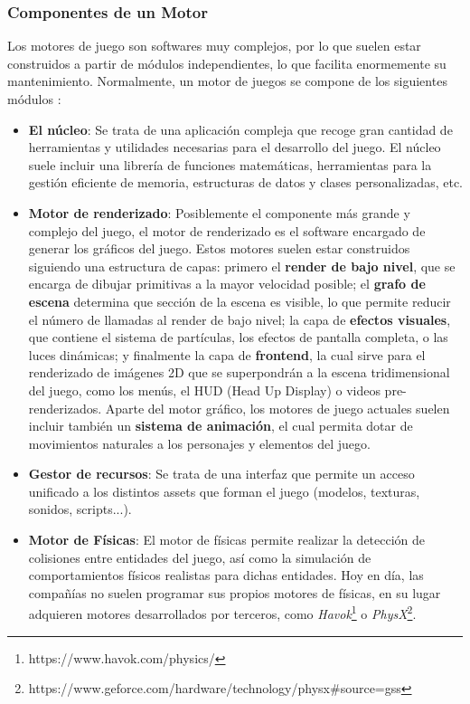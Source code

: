 \subsubsection{Componentes de un Motor}
Los motores de juego son softwares muy complejos, por lo que suelen estar construidos a partir de módulos independientes, lo que facilita enormemente su mantenimiento. Normalmente, un motor de juegos se compone de los siguientes módulos \cite{game_engine_architecture}:
\begin{itemize}
\item\textbf{El núcleo}: Se trata de una aplicación compleja que recoge gran cantidad de herramientas y utilidades necesarias para el desarrollo del juego. El núcleo suele incluir una librería de funciones matemáticas, herramientas para la gestión eficiente de memoria, estructuras de datos y clases personalizadas, etc.
\item\textbf{Motor de renderizado}: Posiblemente el componente más grande y complejo del juego, el motor de renderizado es el software encargado de generar los gráficos del juego. Estos motores suelen estar construidos siguiendo una estructura de capas: primero el \textbf{render de bajo nivel}, que se encarga de dibujar primitivas a la mayor velocidad posible; el \textbf{grafo de escena} determina que sección de la escena es visible, lo que permite reducir el número de llamadas al render de bajo nivel; la capa de \textbf{efectos visuales}, que contiene el sistema de partículas, los efectos de pantalla completa, o las luces dinámicas; y finalmente la capa de \textbf{frontend}, la cual sirve para el renderizado de imágenes 2D que se superpondrán a la escena tridimensional del juego, como los menús, el HUD (Head Up Display) o videos pre-renderizados. Aparte del motor gráfico, los motores de juego actuales suelen incluir también un \textbf{sistema de animación}, el cual permita dotar de movimientos naturales a los personajes y elementos del juego. 
\item\textbf{Gestor de recursos}: Se trata de una interfaz que permite un acceso unificado a los distintos assets que forman el juego (modelos, texturas, sonidos, scripts...). 
\item\textbf{Motor de Físicas}: El motor de físicas permite realizar la detección de colisiones entre entidades del juego, así como la simulación de comportamientos físicos realistas para dichas entidades. Hoy en día, las compañías no suelen programar sus propios motores de físicas, en su lugar adquieren motores desarrollados por terceros, como \textit{Havok}\footnote{https://www.havok.com/physics/} o \textit{PhysX}\footnote{https://www.geforce.com/hardware/technology/physx\#source=gss}.

\end{itemize}
